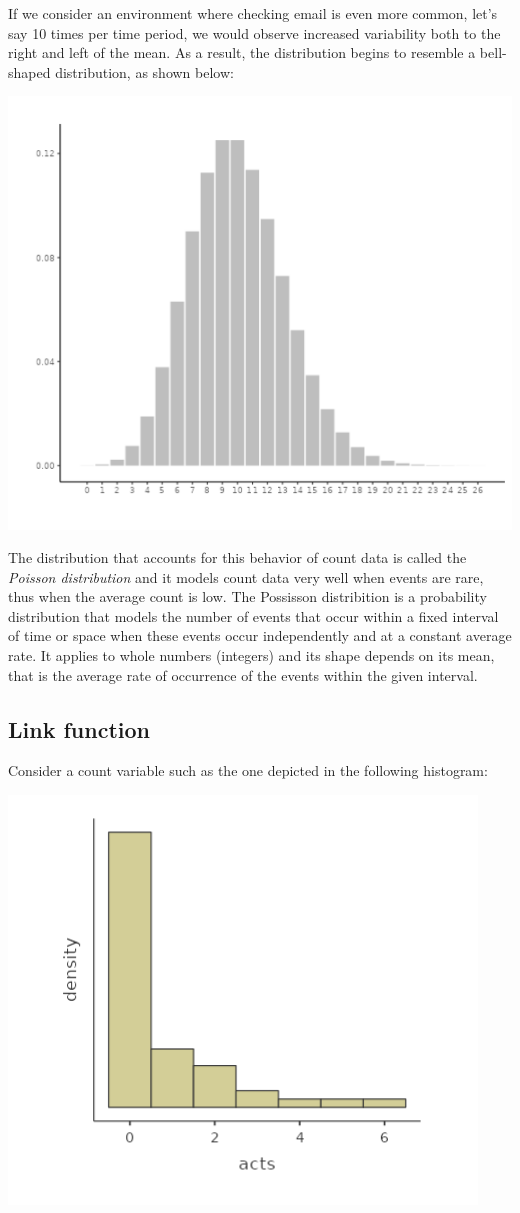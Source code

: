 \documentclass[
]{book}
\begin{document}
If we consider an environment where checking email is even more common, let's say 10 times per time period, we would observe increased variability both to the right and left of the mean. As a result, the distribution begins to resemble a bell-shaped distribution, as shown below:

\includegraphics[width=0.6\linewidth]{bookletpics/3_poisson_theory3}

The distribution that accounts for this behavior of count data is called the \emph{Poisson distribution} and it models count data very well when events are rare, thus when the average count is low. The Possisson distribition is a probability distribution that models the number of events that occur within a fixed interval of time or space when these events occur independently and at a constant average rate. It applies to whole numbers (integers) and its shape depends on its mean, that is the average rate of occurrence of the events within the given interval.

\hypertarget{link-function}{%
\subsection{Link function}\label{link-function}}

Consider a count variable such as the one depicted in the following histogram:

\includegraphics[width=0.6\linewidth]{bookletpics/3_poisson_theory4}
\end{document}
